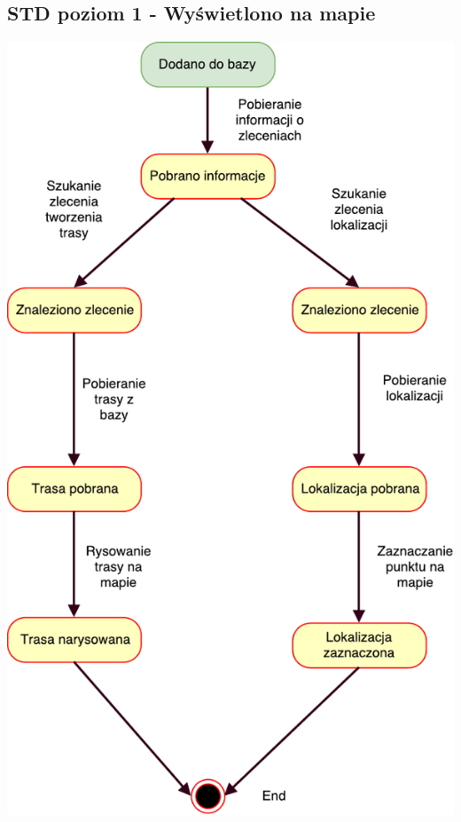 \documentclass[11pt]{article}
\begin{document}
	\subsection{STD poziom 1 - Wyświetlono na mapie}
	\begin{center}
		\includegraphics[scale=0.95]{STD3.pdf}
	\end{center}
	\newpage
\end{document}
